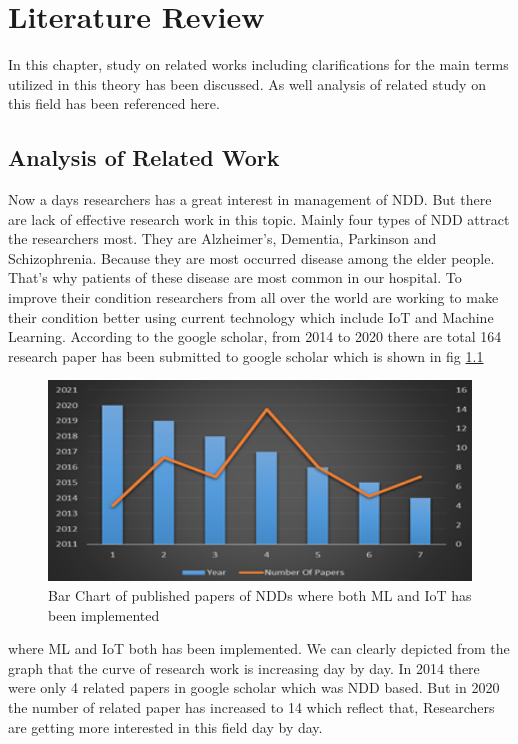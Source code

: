 
\chapter{Literature Review}
\label{chap:2}
In this chapter, study on related works including clarifications for the main terms utilized in this theory has been discussed. As well analysis of related study on this field has been referenced here. 

\section{Analysis of Related Work}
Now a days researchers has a great interest in management of NDD. But there are lack of effective  research work in this topic. Mainly four types of NDD attract the researchers most. They are Alzheimer’s, Dementia, Parkinson and Schizophrenia. Because they are most occurred disease among the elder people.
That's why patients of these disease are most common in our hospital. To improve their condition researchers from all over the world are working to make their condition better using current technology which include IoT and Machine Learning.
 According to the google scholar, from 2014 to 2020 there are total 164 research paper has been submitted to google scholar which is shown in fig  \ref{fig:chart1}
 \begin{figure}[ht]
   \centering
   \includegraphics[width=5.5in]{Chap2/chart1.png}
   \caption{Bar Chart of published papers of NDDs where both ML and IoT has been implemented }
   \label{fig:chart1}
\end{figure}
 where ML and IoT both has been implemented. We can clearly depicted from the graph that the curve of research work is increasing day by day. In 2014 there were only 4 related papers in google scholar which was NDD based. But in 2020 the number of related paper has increased to 14 which reflect that, Researchers are getting more interested in this field day by day. 
